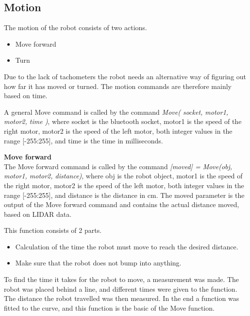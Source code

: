 \subsection{Motion}
The motion of the robot consists of two actions.
\begin{itemize}
\item Move forward 
\item Turn
\end{itemize}
Due to the lack of tachometers the robot needs an alternative way of figuring out how far it has moved or turned. The motion commands are therefore mainly based on time.

A general Move command is called by the command \textit{Move( socket, motor1, motor2, time )}, where socket is the bluetooth socket, motor1 is the speed of the right motor, motor2 is the speed of the left motor, both integer values in the range [-255:255], and time is the time in milliseconds.

\textbf{Move forward}\\
The Move forward command is called by the command \textit{[moved] = Move(obj, motor1, motor2, distance)}, where obj is the robot object, motor1 is the speed of the right motor, motor2 is the speed of the left motor, both integer values in the range [-255:255], and distance is the distance in cm. The moved parameter is the output of the Move forward command and contains the actual distance moved, based on LIDAR data.

This function consists of 2 parts. 
\begin{itemize}
\item Calculation of the time the robot must move to reach the desired distance.
\item Make sure that the robot does not bump into anything.
\end{itemize}
To find the time it takes for the robot to move, a measurement was made. The robot was placed behind a line, and different times were given to the function. The distance the robot travelled was then measured. In the end a function was fitted to the curve, and this function is the basic of the Move function.

